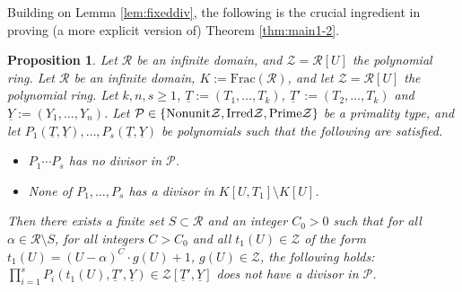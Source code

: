 \documentclass[11pt,a4paper,reqno]{amsart}
\newtheorem{prop}[thm]{Proposition}
\theoremstyle{definition}
\begin{document}
Building on Lemma \ref{lem:fixeddiv}, the following is the crucial ingredient in proving (a more explicit version of) Theorem \ref{thm:main1-2}.

\iffalse
\begin{prop} \label{prop:R[U]-loc-Schinzel-ring}
Let $\mathcal R$ be an infinite domain, and $\mathcal{Z} = \mathcal{R}[U]$ the polynomial ring. Let $\mathcal R$ be an infinite domain, $K:=\textrm{Frac}(\mathcal{R})$, and let $\mathcal{Z} = \mathcal{R}[U]$ the polynomial ring.
Let $k,n,s\ge 1$, $\underline{T} := (T_1,\dots, T_k)$,
$\underline T':=(T_2,\dots, T_k)$ and $\underline Y:=(Y_1,\dots, Y_n)$. Let $\mathcal{P}\in \{\rm{Nonunit} \mathcal{Z}, \rm{Irred} \mathcal{Z}, \rm{Prime} \mathcal{Z}\}$ be a primality type, and let $P_1(\underline T, \underline Y), \dots, P_s(\underline T,\underline Y)$ be polynomials such that the following are satisfied.
\begin{itemize}
\item[i)] $P_1\cdots P_s$ has no divisor in $\mathcal{P}$.
\item[ii)] None of $P_1,\dots, P_s$ has a divisor in $K[U,T_1]\setminus K[U]$.
\end{itemize}
Then there exists a finite set $S\subset \mathcal R$ and an integer $C_0>0$ such that for all $\alpha\in \mathcal{R}\setminus S$, for all integers $C>C_0$ and all $t_1(U)\in \mathcal{Z}$ of the form $t_1(U) = (U-\alpha)^C\cdot g(U) + 1$, $g(U)\in \mathcal{Z}$, the following holds:
$\prod_{i=1}^s P_i(t_1(U),\underline T', \underline Y)\in \mathcal{Z}[\underline T', \underline Y]$ does not have a divisor in $\mathcal{P}$.

%

\end{prop}
\end{document}
